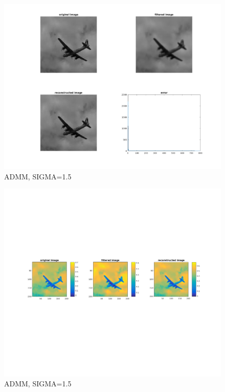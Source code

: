 \documentclass[a4paper, UTF8]{ctexrep}
\begin{document}
			\begin{figure}[h]
				\centering
				\includegraphics[width=\textwidth]{hw4_fig5.png}
				\caption{ADMM, SIGMA=1.5}
				\label{fig:figure1}
			\end{figure}
			\clearpage
			\begin{figure}[h]
				\centering
				\includegraphics[width=\textwidth]{hw4_fig6.png}
				\caption{ADMM, SIGMA=1.5}
				\label{fig:figure1}
			\end{figure}
			\clearpage
\end{document}
